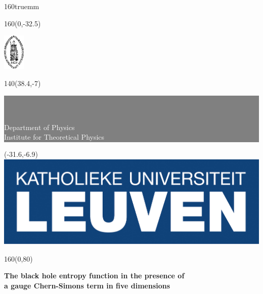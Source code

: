 \documentclass[12pt,twoside]{book}
\begin{document}
\begin{titlepage}
\thispagestyle{empty}

\setlength{\TPHorizModule}{1mm}
\setlength{\TPVertModule}{1mm}

\topmargin -10mm
\textwidth 160truemm
\oddsidemargin 0mm

\begin{textblock}{160}(0,-32.5)
\vspace{-\parskip}
\begin{center}
\includegraphics[width=10.3mm]{sedes}
\end{center}
\end{textblock}
%
\begin{textblock}{140}(38.4,-7)
\colorbox{gray}{\hspace{15mm}\ \parbox[c][21.4truemm]{122mm}{
{\sffamily{\bf \fontsize{14}{16} \selectfont \sffamily \textcolor{white} {FACULTY OF SCIENCE}}\\
{\fontsize{12}{14} \selectfont \textcolor{white} {Department of Physics}}\\
{\fontsize{12}{14} \selectfont \textcolor{white} {Institute for Theoretical Physics}}
}}}
\end{textblock}
%
\begin{textblock}{70}(-31.6,-6.9)
\textblockcolour{}
\includegraphics*[width=70truemm]{kuleuven}
\end{textblock}
%
\begin{textblock}{160}(0,80)
\textblockcolour{}
\vspace{-\parskip}
\begin{center}
\fontsize{16}{18} \selectfont \sffamily\textbf{
The black hole entropy function in the presence of\\
a gauge Chern-Simons term in five dimensions}\vspace{3mm}


\end{center}
\end{textblock}
\end{titlepage}
\end{document}
